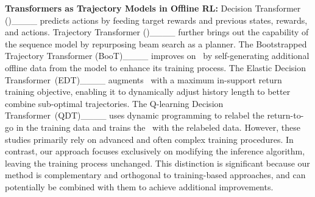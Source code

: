 \textbf{Transformers as Trajectory Models in Offline RL:}
Decision Transformer (\dt)____ predicts actions by feeding target rewards and previous states, rewards, and actions. 
Trajectory Transformer (\trt)____ further brings out the capability of the sequence model by repurposing beam search as a planner. 
The Bootstrapped Trajectory Transformer (BooT)____ improves on~\trt{} by self-generating additional offline data from the model to enhance its training process. The Elastic Decision Transformer~(EDT)____ augments~\dt{} with a maximum in-support return training objective, enabling it to dynamically adjust history length to better combine sub-optimal trajectories. The Q-learning Decision Transformer~(QDT)____ uses dynamic programming to relabel the return-to-go in the training data and trains the~\dt{} with the relabeled data. 
However, these studies primarily rely on advanced and often complex training procedures. 
In contrast, our approach focuses exclusively on modifying the inference algorithm, leaving the training process unchanged. This distinction is significant because our method is complementary and orthogonal to training-based approaches, and can potentially be combined with them to achieve additional improvements.





